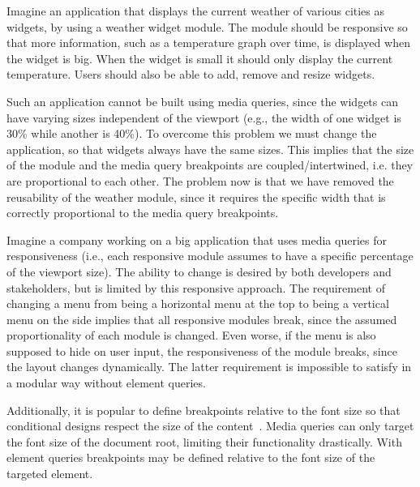 \documentclass{acm_proc_article-sp}
\begin{document}
    Imagine an application that displays the current weather of various cities as widgets, by using a weather widget module.
    The module should be responsive so that more information, such as a temperature graph over time, is displayed when the widget is big.
    When the widget is small it should only display the current temperature.
    Users should also be able to add, remove and resize widgets.

    Such an application cannot be built using media queries, since the widgets can have varying sizes independent of the viewport (e.g., the width of one widget is 30\% while another is 40\%).
    To overcome this problem we must change the application, so that widgets always have the same sizes.
    This implies that the size of the module and the media query breakpoints are coupled/intertwined, i.e. they are proportional to each other.
    The problem now is that we have removed the reusability of the weather module, since it requires the specific width that is correctly proportional to the media query breakpoints. 

    Imagine a company working on a big application that uses media queries for responsiveness (i.e., each responsive module assumes to have a specific percentage of the viewport size).
    The ability to change is desired by both developers and stakeholders, but is limited by this responsive approach.
    The requirement of changing a menu from being a horizontal menu at the top to being a vertical menu on the side implies that all responsive modules break, since the assumed proportionality of each module is changed.
    Even worse, if the menu is also supposed to hide on user input, the responsiveness of the module breaks, since the layout changes dynamically.
    The latter requirement is impossible to satisfy in a modular way without element queries.

    Additionally, it is popular to define breakpoints relative to the font size so that conditional designs respect the size of the content~\cite{mq-em}.
    Media queries can only target the font size of the document root, limiting their functionality drastically.
    With element queries breakpoints may be defined relative to the font size of the targeted element.
\end{document}
